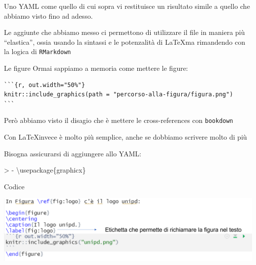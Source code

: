 \documentclass[
  ignorenonframetext,
]{beamer}
\newenvironment{Shaded}{}{}
\newcommand{\BuiltInTok}[1]{#1}
\newcommand{\ExtensionTok}[1]{#1}
\newcommand{\NormalTok}[1]{#1}
\begin{document}
\begin{frame}[fragile]{}
\protect\hypertarget{section-2}{}
Uno YAML come quello di cui sopra vi restituisce un risultato simile a
quello che abbiamo visto fino ad adesso.

Le aggiunte che abbiamo messo ci permettono di utilizzare il file in
maniera più ``elastica'', ossia usando la sintassi e le potenzalità di
\LaTeX ma rimandendo con la logica di \texttt{RMarkdown}
\end{frame}

\begin{frame}[fragile]{Le figure}
\protect\hypertarget{le-figure}{}
Ormai sappiamo a memoria come mettere le figure:

\begin{verbatim}
```{r, out.width="50%"}
knitr::include_graphics(path = "percorso-alla-figura/figura.png")
```
\end{verbatim}

Però abbiamo visto il disagio che è mettere le cross-references con
\texttt{bookdown}

Con \LaTeX invece è molto più semplice, anche se dobbiamo scrivere molto
di più

Bisogna assicurarsi di aggiungere allo YAML:

\begin{Shaded}
\begin{Highlighting}[]
\NormalTok{\textgreater{} {-} }\BuiltInTok{\textbackslash{}usepackage}\NormalTok{\{}\ExtensionTok{graphicx}\NormalTok{\} }
\end{Highlighting}
\end{Shaded}
\end{frame}

\begin{frame}{Codice}
\protect\hypertarget{codice}{}
\begin{center}\includegraphics[width=1\linewidth]{img/figure1} \end{center}
\end{frame}
\end{document}
